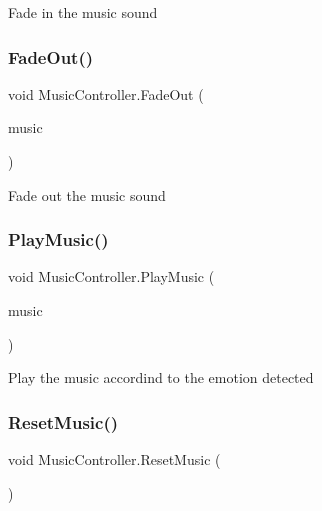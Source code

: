 Fade in the music sound \mbox{\label{class_music_controller_a6f549e39e322a2b65adac53f7d931bc6}} 
\subsubsection{\texorpdfstring{Fade\+Out()}{FadeOut()}}
{\footnotesize\ttfamily void Music\+Controller.\+Fade\+Out (\begin{DoxyParamCaption}\item[{Audio\+Source}]{music }\end{DoxyParamCaption})\hspace{0.3cm}{\ttfamily [private]}}

Fade out the music sound \mbox{\label{class_music_controller_a7d34bde91299800af6deb844e6a3ce4b}} 
\subsubsection{\texorpdfstring{Play\+Music()}{PlayMusic()}}
{\footnotesize\ttfamily void Music\+Controller.\+Play\+Music (\begin{DoxyParamCaption}\item[{Audio\+Source}]{music }\end{DoxyParamCaption})\hspace{0.3cm}{\ttfamily [private]}}

Play the music accordind to the emotion detected \mbox{\label{class_music_controller_ae16b96ac7e2075229191a3cdd4765bde}} 
\subsubsection{\texorpdfstring{Reset\+Music()}{ResetMusic()}}
{\footnotesize\ttfamily void Music\+Controller.\+Reset\+Music (\begin{DoxyParamCaption}{ }\end{DoxyParamCaption})}

